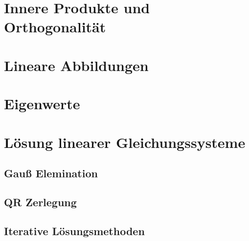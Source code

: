 
\chapter{Innere Produkte und Orthogonalität}


\chapter{Lineare Abbildungen}


\chapter{Eigenwerte}



\chapter{Lösung linearer Gleichungssysteme}

\section{Gauß Elemination}

\section{QR Zerlegung}

\section{Iterative Lösungsmethoden}




